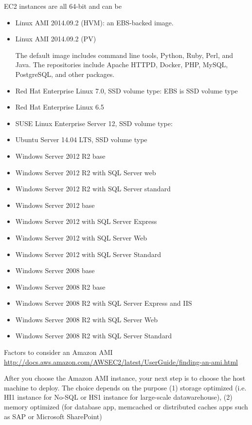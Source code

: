 EC2 instances are all 64-bit and can be
\begin{itemize} 
  \item Linux AMI 2014.09.2 (HVM): an EBS-backed image. 
  \item Linux AMI 2014.09.2 (PV)
  
  The default image includes  command line tools, Python, Ruby, Perl, and Java.
  The repositories include Apache HTTPD, Docker, PHP, MySQL, PostgreSQL, and other packages.
  
  \item Red Hat Enterprise Linux 7.0, SSD volume type: EBS is SSD volume type
  \item Red Hat Enterprise Linux 6.5
  
  \item SUSE Linux Enterprise Server 12, SSD volume type:
  
  \item Ubuntu Server 14.04 LTS, SSD volume type
  
  \item Windows Server 2012 R2 base
  \item Windows Server 2012 R2 with SQL Server web
  \item Windows Server 2012 R2 with SQL Server standard
  \item Windows Server 2012 base
  \item Windows Server 2012 with SQL Server Express
  \item Windows Server 2012 with SQL Server Web
  \item Windows Server 2012 with SQL Server Standard
  
  \item Windows Server 2008 base
  \item Windows Server 2008 R2 base
  \item Windows Server 2008 R2 with SQL Server Express and IIS
  \item Windows Server 2008 R2 with SQL Server Web
  \item Windows Server 2008 R2 with SQL Server Standard
\end{itemize}

Factors to consider an Amazon AMI
\url{http://docs.aws.amazon.com/AWSEC2/latest/UserGuide/finding-an-ami.html}

After you choose the Amazon AMI instance, your next step is to choose the host
machine to deploy. The choice depends on the purpose (1) storage optimized
(i.e. HI1 instance for No-SQL or HS1 instance for large-scale datawarehouse),
(2) memory optimized (for database app, memcached or distributed caches apps
such as SAP or Microsoft SharePoint)

